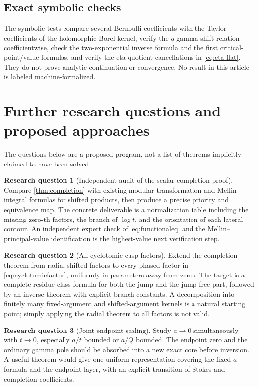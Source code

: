 \documentclass[11pt,a4paper]{article}
\numberwithin{equation}{section}
\theoremstyle{definition}
\newtheorem{problem}{Research question}
\theoremstyle{remark}
\begin{document}
\subsection{Exact symbolic checks}
The symbolic tests compare several Bernoulli coefficients with the
Taylor coefficients of the holomorphic Borel kernel, verify the
$q$-gamma shift relation coefficientwise, check the two-exponential
inverse formula and the first critical-point/value formulas, and
verify the eta-quotient cancellations in \eqref{eq:eta-flat}. They do
not prove analytic continuation or convergence. No result in this
article is labeled machine-formalized.

\section{Further research questions and proposed approaches}
\label{sec:research}

The questions below are a proposed program, not a list of theorems
implicitly claimed to have been solved.

\begin{problem}[Independent audit of the scalar completion proof]
Compare \cref{thm:completion} with existing modular transformation and
Mellin-integral formulas for shifted products, then produce a precise
priority and equivalence map. The concrete deliverable is a
normalization table including the missing zero-th factors, the branch
of $\log t$, and the orientation of each lateral contour. An
independent expert check of \eqref{eq:functionaleq} and the
Mellin--principal-value identification is the highest-value next
verification step.
\end{problem}

\begin{problem}[All cyclotomic cusp factors]
Extend the completion theorem from radial shifted factors to every
phased factor in \eqref{eq:cyclotomicfactor}, uniformly in parameters
away from zeros. The target is a complete residue-class formula for
both the jump and the jump-free part, followed by an inverse theorem
with explicit branch constants. A decomposition into finitely many
fixed-argument and shifted-argument kernels is a natural starting
point; simply applying the radial theorem to all factors is not valid.
\end{problem}

\begin{problem}[Joint endpoint scaling]
Study $a\to0$ simultaneously with $t\to0$, especially $a/t$ bounded
or $a/Q$ bounded. The endpoint zero and the ordinary gamma pole should
be absorbed into a new exact core before inversion. A useful theorem
would give one uniform representation covering the fixed-$a$ formula
and the endpoint layer, with an explicit transition of Stokes and
completion coefficients.
\end{problem}
\end{document}
